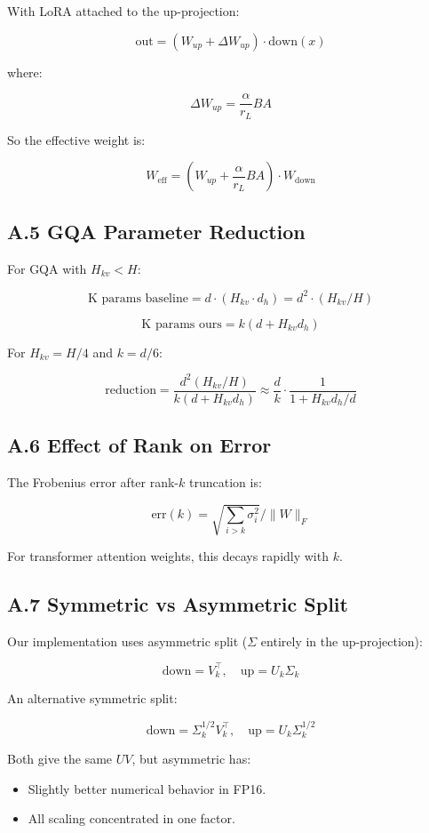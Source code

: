 With LoRA attached to the up-projection:

\[
\text{out} = (W_{up} + \Delta W_{up}) \cdot \text{down}(x)
\]

where:

\[
\Delta W_{up} = \frac{\alpha}{r_L} B A
\]

So the effective weight is:

\[
W_\text{eff} = (W_{up} + \frac{\alpha}{r_L} B A) \cdot W_\text{down}
\]

\subsection{A.5 GQA Parameter Reduction}

For GQA with $H_{kv} < H$:

\[
\text{K params baseline} = d \cdot (H_{kv} \cdot d_h) = d^2 \cdot (H_{kv}/H)
\]

\[
\text{K params ours} = k(d + H_{kv} d_h)
\]

For $H_{kv} = H/4$ and $k = d/6$:

\[
\text{reduction} = \frac{d^2 (H_{kv}/H)}{k(d + H_{kv} d_h)} \approx \frac{d}{k} \cdot \frac{1}{1 + H_{kv} d_h / d}
\]

\subsection{A.6 Effect of Rank on Error}

The Frobenius error after rank-$k$ truncation is:

\[
\text{err}(k) = \sqrt{\sum_{i > k} \sigma_i^2} / \|W\|_F
\]

For transformer attention weights, this decays rapidly with $k$.

\subsection{A.7 Symmetric vs Asymmetric Split}

Our implementation uses asymmetric split ($\Sigma$ entirely in the up-projection):

\[
\text{down} = V_k^\top, \quad \text{up} = U_k \Sigma_k
\]

An alternative symmetric split:

\[
\text{down} = \Sigma_k^{1/2} V_k^\top, \quad \text{up} = U_k \Sigma_k^{1/2}
\]

Both give the same $UV$, but asymmetric has:
\begin{itemize}
\item Slightly better numerical behavior in FP16.
\item All scaling concentrated in one factor.

\end{itemize}
